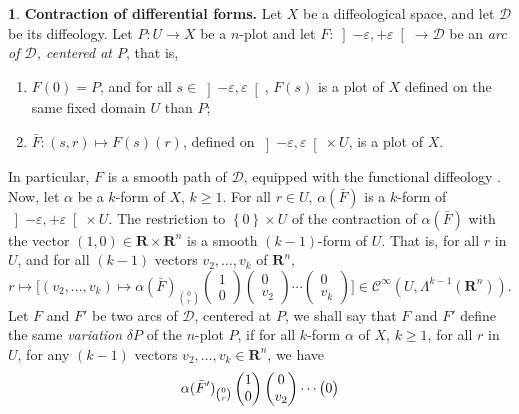 \documentclass[11pt,reqno]{amsart}
\theoremstyle{definition}
\newtheorem{article}{}
\newcommand{\artlabel}[1]{{\bf #1.}}
\newcommand{\RR}{{\mathbf R}}
\def \F{{F}}
\def \P{{P}}
\def \U{{U}}
\def \X{{X}}
\newcommand{\cC}{{\mathcal C}}
\newcommand{\cD}{{\mathcal D}}
\newcommand{\Form}{\mbox{$\Lambda$}}
\newcommand{\set}[1]{\left\{ #1 \right\}}
\newcommand{\Cinf}{{\cC}^\infty}
\newcommand{\openinterval}[1]{\left] #1 \right[}
\begin{document}
  \begin{article}\artlabel{Contraction of differential forms}
    \label{Contraction-of-differential-forms}
    Let $\X$ be a diffeological space, and let $\cD$ be its diffeology. Let
    $\P : \U \to \X$ be a $n$-plot and let $\F :
      \openinterval{-\varepsilon, +\varepsilon} \to \cD$ be an
    {\em arc of $\cD$, centered at $\P$\/},  that is,
    \begin{enumerate}
      \item[a)] $\F(0) = \P$, and for all $s \in
        \openinterval{-\varepsilon,\varepsilon}$, $\F(s)$ is a plot of
      $\X$ defined on the same fixed domain $\U$ than $\P$;
      \item[b)] $\bar \F : (s,r) \mapsto \F(s)(r)$,
      defined on $\openinterval{-\varepsilon,\varepsilon} \times \U$,
      is a plot of $\X$.
    \end{enumerate}
    In particular, $\F$ is a smooth path of $\cD$, equipped
    with the functional diffeology \cite{Piz05}.
    Now, let $\alpha$ be a $k$-form of $\X$, $k \geq 1$. For
    all $r \in \U$, $\alpha(\bar \F)$ is a $k$-form of
    $\openinterval{-\varepsilon, +\varepsilon} \times \U$.
    The restriction to  $\set{0} \times \U$ of the
    contraction of $\alpha(\bar \F)$ with the vector $(1,0)
      \in \RR \times \RR^n$ is a smooth $(k-1)$-form of $\U$.
    That is, for all $r$ in $\U$, and for all $(k-1)$ vectors
    $v_2,\ldots,v_{k}$ of $\RR^n$,
    $$
      r \mapsto \bigg[(v_2,\ldots,v_k) \mapsto \alpha(\bar
      \F)_{0 \choose r}\begin{pmatrix}1 \\ 0\end{pmatrix}
      \begin{pmatrix}0 \\ v_2\end{pmatrix} \cdots\begin{pmatrix}0 \\ v_{k}\end{pmatrix} \bigg]
      \in \Cinf(\U,\Form^{k-1}(\RR^n)).
      $$ 
    Let $\F$ and $\F'$ be two arcs of $\cD$,
    centered at $\P$, we shall say that $\F$ and $\F'$ define
    the same {\em variation\/} $\delta \P$ of the $n$-plot
    $\P$, if for all $k$-form $\alpha$ of $\X$,
    $k\geq 1$, for all $r$ in $\U$, for any $(k-1)$ vectors
    $v_2,\ldots,v_{k} \in \RR^n$, we have
    \begin{equation}
      \renewcommand{\theequation}{$\heartsuit$}
      \alpha(\bar \F')_{0 \choose r}
      \begin{pmatrix}1 \\ 0\end{pmatrix} \begin{pmatrix}0 \\ v_2\end{pmatrix} \cdots \begin{pmatrix}0 \cr

\end{pmatrix}
\end{equation}
\end{article}
\end{document}
